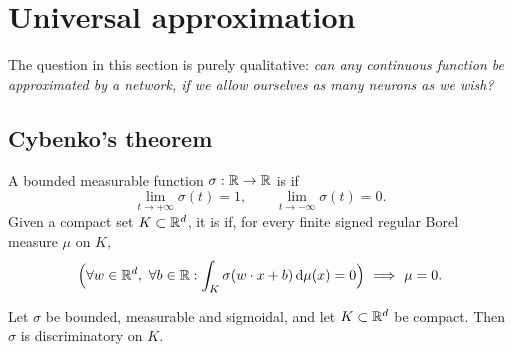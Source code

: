 \documentclass[11pt,a4paper]{article}
\begin{document}
\section{Universal approximation}

The question in this section is purely qualitative: \emph{can any continuous function be
approximated by a network, if we allow ourselves as many neurons as we wish?}

\subsection{Cybenko's theorem}

\begin{definition}
A bounded measurable function $\sigma : \mathbb{R} \to \mathbb{R}$ is  if
\[
\lim_{t \to +\infty} \sigma(t) = 1, \qquad \lim_{t \to -\infty} \sigma(t) = 0 .
\]
Given a compact set $K \subset \mathbb{R}^d$, it is  if, for every finite
signed regular Borel measure $\mu$ on $K$,
\[
\Big( \forall w \in \mathbb{R}^d,\ \forall b \in \mathbb{R} : \int_K \sigma(w\cdot x + b)\, \mathrm{d}\mu(x) = 0 \Big)
\ \Longrightarrow \ \mu = 0 .
\]
\end{definition}

\begin{lemma}\label{lem:discr}
Let $\sigma$ be bounded, measurable and sigmoidal, and let $K \subset \mathbb{R}^d$ be compact. Then
$\sigma$ is discriminatory on $K$.
\end{lemma}
\end{document}

